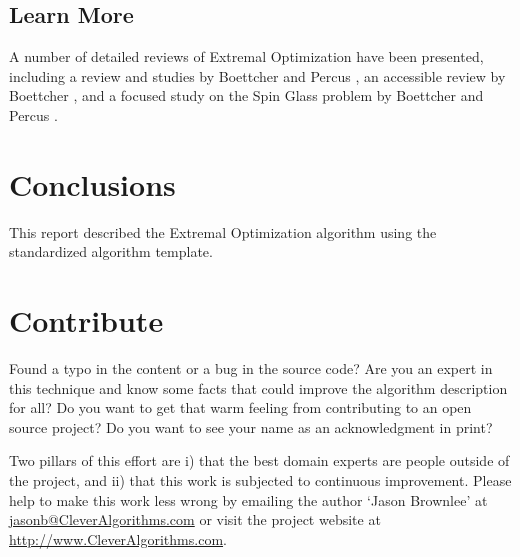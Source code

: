 \documentclass[a4paper, 11pt]{article}
\makeatletter
\newcommand{\myreportauthor}{Jason Brownlee}
\newcommand{\myreportemail}{jasonb@CleverAlgorithms.com}
\newcommand{\myreportwebsite}{http://www.CleverAlgorithms.com}
\makeatother
\begin{document}
% 
% 
\subsection{Learn More}
A number of detailed reviews of Extremal Optimization have been presented, including a review and studies by Boettcher and Percus \cite{Boettcher2000}, an accessible review by Boettcher \cite{Boettcher2000a}, and a focused study on the Spin Glass problem by Boettcher and Percus \cite{Boettcher2001}.


% 
% 
\section{Conclusions}
\label{sec:conclusions}
This report described the Extremal Optimization algorithm using the standardized algorithm template.

% 
% 
\section{Contribute}
\label{sec:contribute}
Found a typo in the content or a bug in the source code? 
Are you an expert in this technique and know some facts that could improve the algorithm description for all?
Do you want to get that warm feeling from contributing to an open source project? 
Do you want to see your name as an acknowledgment in print?

Two pillars of this effort are i) that the best domain experts are people outside of the project, and ii) that this work is subjected to continuous improvement. 
Please help to make this work less wrong by emailing the author `\myreportauthor' at \url{\myreportemail} or visit the project website at \url{\myreportwebsite}.



\end{document}
